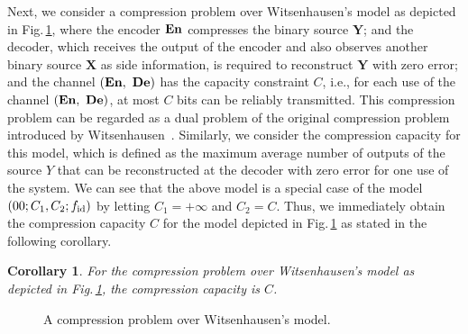 \documentclass[11pt,draftclsnofoot,onecolumn]{IEEEtran}
\newtheorem{cor}{Corollary}
\newcommand{\En}{\bf{En}}
\newcommand{\De}{\bf{De}}
\begin{document}
Next, we consider a compression problem over Witsenhausen's model as depicted in Fig.\,\ref{fig:Side-infor-model-00}, where the encoder $\En$ compresses the binary source $\boldsymbol{Y}$; and the decoder, which  receives the output of the encoder and also observes another binary source  $\boldsymbol{X}$ as side information, is required to reconstruct $\boldsymbol{Y}$ with zero error; and the channel $(\En,~\De)$ has the capacity constraint
$C$, i.e., for each use of the channel $(\En,~\De)$, at most $C$ bits can be reliably transmitted.
This compression problem can be regarded as a dual problem of the original compression problem introduced by   Witsenhausen~\cite{Witsenhausen-IT-76}. Similarly, we consider the compression capacity for this model, which is defined as the maximum average number of outputs of the source $Y$ that can be reconstructed at the decoder with zero error for one use of the system.
We can see that the above model is a special case of the model $(00;C_1,C_2;f_{\rm{\text{id}}})$ by letting $C_1=+\infty$ and $C_2=C$. Thus, we immediately obtain the compression capacity $C$ for the model depicted in Fig.\,\ref{fig:Side-infor-model-00} as stated in the following corollary.

\begin{cor}
 For the compression problem over Witsenhausen's model as depicted in Fig.\,\ref{fig:Side-infor-model-00}, the compression capacity is $C$.
\end{cor}

\begin{figure}[t]
 \centering
  {
}
\caption{A  compression problem  over Witsenhausen's model.}\label{fig:Side-infor-model-00}
\end{figure}
\end{document}
